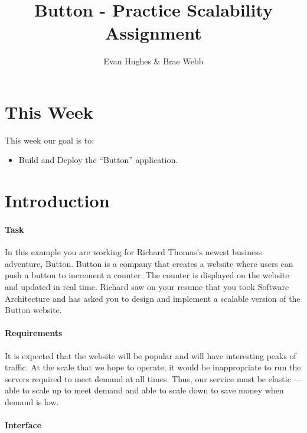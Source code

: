 \documentclass{csse4400}
\title{Button - Practice Scalability Assignment}
\author{Evan Hughes \& Brae Webb}
\date{\week{0}}
\begin{document}
\maketitle


\section{This Week}
This week our goal is to:
\begin{itemize}
  \item Build and Deploy the ``Button'' application.
\end{itemize}

\section{Introduction}

\paragraph{Task}

In this example you are working for Richard Thomas's newest business adventure, Button. Button is a company that creates a website where users can push a button to increment a counter. The counter is displayed on the website and updated in real time. Richard saw on your resume that you took Software Architecture and has asked you to design and implement a scalable version of the Button website.

\paragraph{Requirements}

It is expected that the website will be popular and will have interesting peaks of traffic. At the scale that we hope to operate, it would be inappropriate to run the servers required to meet demand at all times. Thus, our service must be elastic --- able to scale up to meet demand and able to scale down to save money when demand is low.

\paragraph{Interface}
\end{document}
